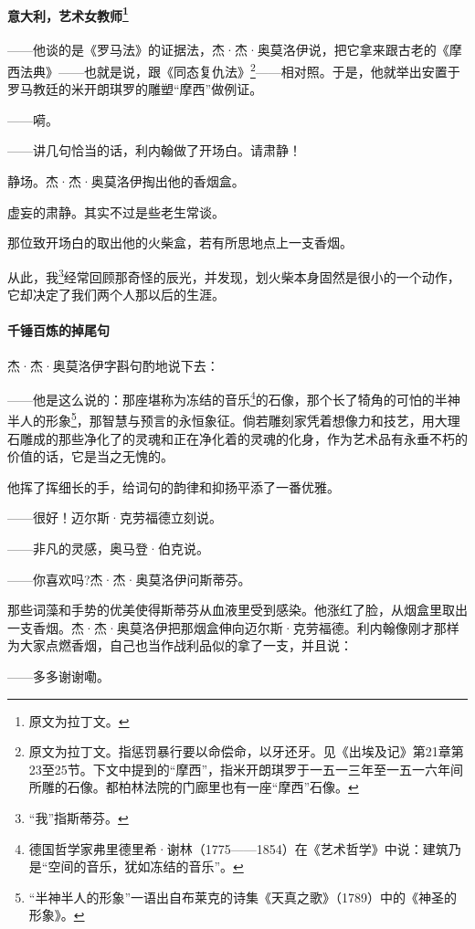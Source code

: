 \paragraph*{意大利，艺术女教师\footnote{原文为拉丁文。}}
\par ——他谈的是《罗马法》的证据法，杰·杰·奥莫洛伊说，把它拿来跟古老的《摩西法典》——也就是说，跟《同态复仇法》\footnote{原文为拉丁文。指惩罚暴行要以命偿命，以牙还牙。见《出埃及记》第21章第23至25节。下文中提到的“摩西”，指米开朗琪罗于一五一三年至一五一六年间所雕的石像。都柏林法院的门廊里也有一座“摩西”石像。}——相对照。于是，他就举出安置于罗马教廷的米开朗琪罗的雕塑“摩西”做例证。
\par ——嗬。
\par ——讲几句恰当的话，利内翰做了开场白。请肃静！
\par 静场。杰·杰·奥莫洛伊掏出他的香烟盒。
\par 虚妄的肃静。其实不过是些老生常谈。
\par 那位致开场白的取出他的火柴盒，若有所思地点上一支香烟。
\par 从此，我\footnote{“我”指斯蒂芬。}经常回顾那奇怪的辰光，并发现，划火柴本身固然是很小的一个动作，它却决定了我们两个人那以后的生涯。
\paragraph*{千锤百炼的掉尾句}
\par 杰·杰·奥莫洛伊字斟句酌地说下去：
\par ——他是这么说的：那座堪称为冻结的音乐\footnote{德国哲学家弗里德里希·谢林（1775——1854）在《艺术哲学》中说：建筑乃是“空间的音乐，犹如冻结的音乐”。}的石像，那个长了犄角的可怕的半神半人的形象\footnote{“半神半人的形象”一语出自布莱克的诗集《天真之歌》（1789）中的《神圣的形象》。}，那智慧与预言的永恒象征。倘若雕刻家凭着想像力和技艺，用大理石雕成的那些净化了的灵魂和正在净化着的灵魂的化身，作为艺术品有永垂不朽的价值的话，它是当之无愧的。
\par 他挥了挥细长的手，给词句的韵律和抑扬平添了一番优雅。
\par ——很好！迈尔斯·克劳福德立刻说。
\par ——非凡的灵感，奥马登·伯克说。
\par ——你喜欢吗?杰·杰·奥莫洛伊问斯蒂芬。
\par 那些词藻和手势的优美使得斯蒂芬从血液里受到感染。他涨红了脸，从烟盒里取出一支香烟。杰·杰·奥莫洛伊把那烟盒伸向迈尔斯·克劳福德。利内翰像刚才那样为大家点燃香烟，自己也当作战利品似的拿了一支，并且说：
\par ——多多谢谢嘞。
